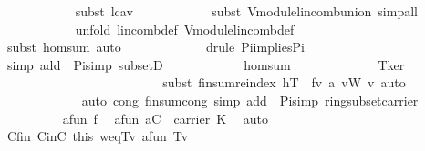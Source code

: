 \begin{isabellebody}
\ \ \ \ \ \ \ \ \ \ \isamarkupfalse%
\ {\isacharparenleft}subst\ lc{\isacharunderscore}a{\isacharunderscore}v{\isacharparenright}\isanewline
\ \ \ \ \ \ \ \ \ \ \isamarkupfalse%
\ {\isacharparenleft}subst\ V{\isachardot}module{\isachardot}lincomb{\isacharunderscore}union{\isacharcomma}\ simp{\isacharunderscore}all{\isacharparenright}\ \isanewline
\ \ \ \ \ \ \ \ \ \ \isamarkupfalse%
\ {\isacharparenleft}unfold\ lincomb{\isacharunderscore}def\ V{\isachardot}module{\isachardot}lincomb{\isacharunderscore}def{\isacharparenright}\isanewline
\ \ \ \ \ \ \ \ \ \ \isamarkupfalse%
\ {\isacharparenleft}subst\ hom{\isacharunderscore}sum{\isacharcomma}\ auto{\isacharparenright}\ \isanewline
\ \ \ \ \ \ \ \ \ \ \isamarkupfalse%
\ {\isacharparenleft}drule\ Pi{\isacharunderscore}implies{\isacharunderscore}Pi{}{\isacharparenright}{\isacharplus}\isanewline
\ \ \ \ \ \ \ \ \ \ \isamarkupfalse%
\ {\isacharparenleft}simp\ add{\isacharcolon}\ \ Pi{\isacharunderscore}simp\ subsetD\isanewline
\ \ \ \ \ \ \ \ \ \ \ \ hom{\isacharunderscore}sum\ \isanewline
\ \ \ \ \ \ \ \ \ \ \ \ T{\isacharunderscore}ker\ \isanewline
\ \ \ \ \ \ \ \ \ \ \ \ {\isacharparenright}\ \isanewline
\ \ \ \ \ \ \ \ \ \ \isamarkupfalse%
\ {\isacharparenleft}subst\ finsum{\isacharunderscore}reindex{\isacharbrackleft}\ {\isacharquery}h{\isacharequal}{\isachardoublequoteopen}T{\isachardoublequoteclose}\ \ {\isacharquery}f{\isacharequal}{\isachardoublequoteopen}{\isasymlambda}v{\isachardot}\ {\isacharquery}a{\isacharprime}\ v{\isasymodot}\isactrlbsub W\isactrlesub \ v{\isachardoublequoteclose}{\isacharbrackright}{\isacharcomma}\ auto{\isacharparenright}\isanewline
\ \ \ \ \ \ \ \ \ \ \ \isamarkupfalse%
\ {\isacharparenleft}auto\ cong{\isacharcolon}\ finsum{\isacharunderscore}cong\ simp\ add{\isacharcolon}\ \ Pi{\isacharunderscore}simp\ ring{\isacharunderscore}subset{\isacharunderscore}carrier{\isacharparenright}\isanewline
\ \ \ \ \ \ \ \ \isamarkupfalse%
\ a{\isacharunderscore}fun\ f\ \isamarkupfalse%
\ a{\isacharprime}{\isacharunderscore}fun{\isacharcolon}\ {\isachardoublequoteopen}{\isacharquery}a{\isacharprime}{\isasymin}{\isacharquery}C{\isacharprime}\ {\isasymrightarrow}\ carrier\ K{\isachardoublequoteclose}\ \isamarkupfalse%
\ auto\isanewline
\ \ \ \ \ \ \ \ \isamarkupfalse%
\ C{\isacharprime}fin\ CinC\ this\ w{\isacharunderscore}eq{\isacharunderscore}T{\isacharunderscore}v\ a{\isacharprime}{\isacharunderscore}fun\ Tv\ \isamarkupfalse%

\end{isabellebody}
